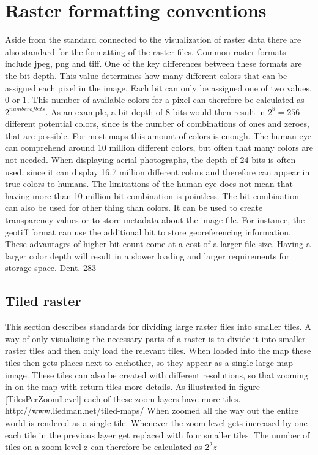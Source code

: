 \section{Raster formatting conventions}

Aside from the standard connected to the visualization of raster data there are also standard for the formatting of the raster files. Common raster formats include jpeg, png and tiff. One of the key differences between these formats are the bit depth. This value determines how many different colors that can be assigned each pixel in the image. Each bit can only be assigned one of two values, 0 or 1. This number of available colors for a pixel can therefore be calculated as $2^{number of bits}$. As an example, a bit depth of 8 bits would then result in $2^8 = 256$ different potential colors, since is the number of combinations of ones and zeroes, that are possible. For most maps this amount of colors is enough. The human eye can comprehend around 10 million different colors, but often that many colors are not needed. When displaying aerial photographs, the depth of 24 bits is often used, since it can display 16.7 million different colors and therefore can appear in true-colors to humans.
The limitations of the human eye does not mean that having more than 10 million bit combination is pointless. The bit combination can also be used for other thing than colors. It can be used to create transparency values or to store metadata about the image file. For instance, the geotiff format can use the additional bit to store georeferencing information.
These advantages of higher bit count come at a cost of a larger file size. Having a larger color depth will result in a slower loading and larger requirements for storage space.
Dent. 283 
\subsection{Tiled raster}
This section describes standards for dividing large raster files into smaller tiles. 
A way of only visualising the necessary parts of a raster is to divide it into smaller raster tiles and then only load the relevant tiles. When loaded into the map these tiles then gets places next to eachother, so they appear as a single large map image. These tiles can also be created with different resolutions, so that zooming in on the map with return tiles more details.  As illustrated in figure \ref{TilesPerZoomLevel} each of these zoom layers have more tiles.
http://www.liedman.net/tiled-maps/
When zoomed all the way out the entire world is rendered as a single tile. Whenever the zoom level gets increased by one each tile in the previous layer get replaced with four smaller tiles. The number of tiles on a zoom level z can therefore be calculated as $2^2z$

